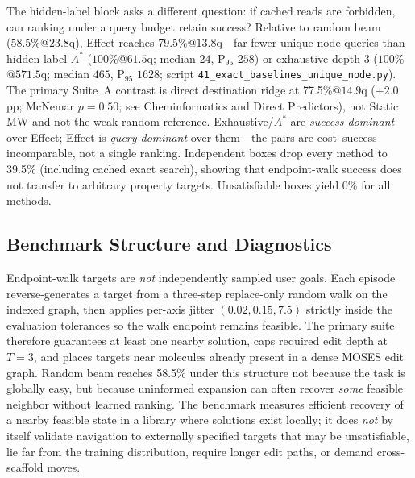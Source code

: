 The hidden-label block asks a different question: if cached reads are forbidden, can ranking under a query budget retain success? Relative to random beam (58.5\%@$23.8$q), Effect reaches 79.5\%@$13.8$q---far fewer unique-node queries than hidden-label $A^\ast$ ($100\%$@$61.5$q; median $24$, P$_{95}$ $258$) or exhaustive depth-3 ($100\%$@$571.5$q; median $465$, P$_{95}$ $1628$; script \texttt{41\_exact\_baselines\_unique\_node.py}). The primary Suite~A contrast is direct destination ridge at 77.5\%@$14.9$q ($+2.0$pp; McNemar $p{=}0.50$; see Cheminformatics and Direct Predictors), not Static MW and not the weak random reference. Exhaustive/$A^\ast$ are \emph{success-dominant} over Effect; Effect is \emph{query-dominant} over them---the pairs are cost--success incomparable, not a single ranking. Independent boxes drop every method to 39.5\% (including cached exact search), showing that endpoint-walk success does not transfer to arbitrary property targets. Unsatisfiable boxes yield 0\% for all methods.

\subsection{Benchmark Structure and Diagnostics}
\label{sec:benchmark_diag}

Endpoint-walk targets are \emph{not} independently sampled user goals. Each episode reverse-generates a target from a three-step replace-only random walk on the indexed graph, then applies per-axis jitter $(0.02,0.15,7.5)$ strictly inside the evaluation tolerances so the walk endpoint remains feasible. The primary suite therefore guarantees at least one nearby solution, caps required edit depth at $T{=}3$, and places targets near molecules already present in a dense MOSES edit graph. Random beam reaches 58.5\% under this structure not because the task is globally easy, but because uninformed expansion can often recover \emph{some} feasible neighbor without learned ranking. The benchmark measures efficient recovery of a nearby feasible state in a library where solutions exist locally; it does \emph{not} by itself validate navigation to externally specified targets that may be unsatisfiable, lie far from the training distribution, require longer edit paths, or demand cross-scaffold moves.

